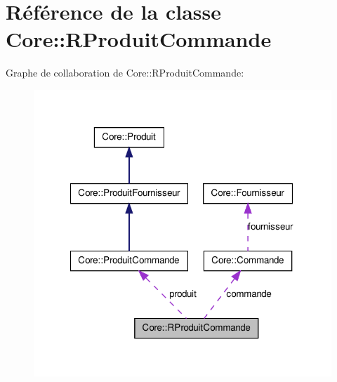 \hypertarget{class_core_1_1_r_produit_commande}{
\section{Référence de la classe Core::RProduitCommande}
\label{d3/dad/class_core_1_1_r_produit_commande}
}


Graphe de collaboration de Core::RProduitCommande:\nopagebreak
\begin{figure}[H]
\begin{center}
\leavevmode
\includegraphics[width=318pt]{d3/dbc/class_core_1_1_r_produit_commande__coll__graph}
\end{center}
\end{figure}
